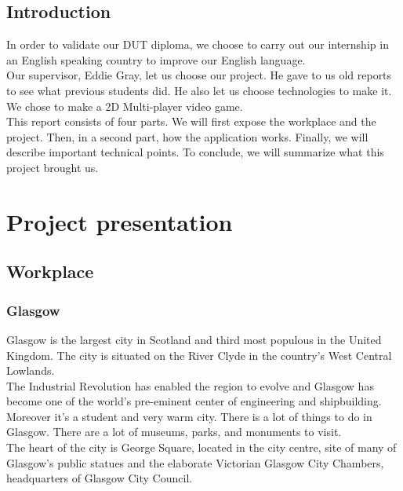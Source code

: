 \documentclass{scrreprt}
\begin{document}
		  \chapter*{Introduction} 
		  In order to validate our DUT diploma, we choose to carry out our internship in an
		  English speaking country to improve our English language.\\

		  Our supervisor, Eddie Gray, let us choose our project. He gave to us old reports to see what previous students did. He also let us choose technologies to make it.\\

		  We chose to make a 2D Multi-player video game.\\

		  This report consists of four parts. We will first expose the workplace and the project. Then, in a second part, how the application works. Finally, we will describe important technical points.
		  To conclude, we will summarize what this project brought us.\\
	
		  \renewcommand{\contentsname}{Summary}
		  \tableofcontents

		  \part{Project presentation}
		  \chapter{Workplace}
		  \section{Glasgow}%
		  Glasgow is the largest city in Scotland and third most populous in the United
		  Kingdom. The city is situated on the River Clyde in the country's West Central Lowlands.\\

		 The Industrial Revolution has enabled the 
	   	 region to evolve and Glasgow has become one of the world's pre-eminent center of 
		 engineering and shipbuilding. Moreover it's a student and very warm city. There is a 
		 lot of things to do in Glasgow. There are a lot of museums, parks, and monuments to
		 visit.\\

		  The heart of the city is George Square, located in the city centre, site of many of
		  Glasgow's public statues and the elaborate Victorian Glasgow City Chambers, headquarters
		  of Glasgow City Council.\\
\end{document}
